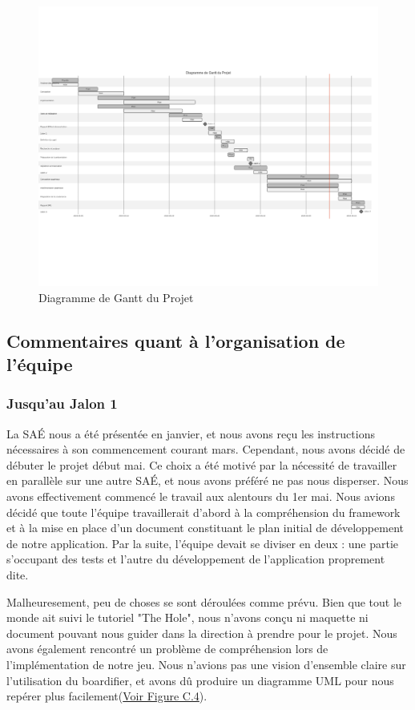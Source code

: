 \begin{figure}[h]
    \centering
    \includegraphics[width=\textwidth,angle=0]{./images/mermaid-diagram}
    \caption{Diagramme de Gantt du Projet}
    \label{fig:gantt}
\end{figure}

\subsection{Commentaires quant à l'organisation de l'équipe}

\subsubsection{Jusqu'au Jalon 1}

La SAÉ nous a été présentée en janvier, et nous avons reçu les instructions nécessaires à son commencement courant mars.
Cependant, nous avons décidé de débuter le projet début mai.
Ce choix a été motivé par la nécessité de travailler en parallèle sur une autre SAÉ, et nous avons préféré ne pas nous disperser.
Nous avons effectivement commencé le travail aux alentours du 1er mai.
Nous avions décidé que toute l'équipe travaillerait d'abord à la compréhension du framework et à la mise en place d'un document constituant le plan initial de développement de notre application.
Par la suite, l'équipe devait se diviser en deux : une partie s'occupant des tests et l'autre du développement de l'application proprement dite.

Malheuresement, peu de choses se sont déroulées comme prévu.
Bien que tout le monde ait suivi le tutoriel "The Hole", nous n'avons conçu ni maquette ni document pouvant nous guider dans la direction à prendre pour le projet.
Nous avons également rencontré un problème de compréhension lors de l'implémentation de notre jeu.
Nous n'avions pas une vision d'ensemble claire sur l'utilisation du boardifier, et avons dû produire un diagramme UML pour nous repérer plus facilement(\hyperref[fig:uml]{Voir Figure C.4}).

